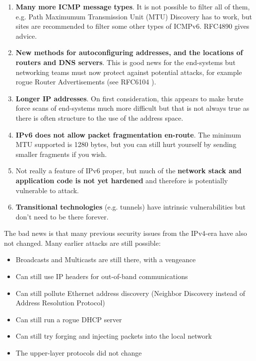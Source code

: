 \begin{enumerate}

\item {\bf Many more ICMP message types}. It is not possible to filter all of them, e.g. Path Maximumum Transmission Unit (MTU) Discovery has to work, but sites are recommended to filter some other types of ICMPv6. RFC4890 \cite{rfc} gives advice.

\item {\bf New methods for autoconfiguring addresses, and the locations of routers and DNS servers}. This is good news for the end-systems but networking teams must now protect against potential attacks, for example rogue Router Advertisements (see RFC6104 \cite{rfc}).

\item {\bf Longer IP addresses}. On first consideration, this appears to make brute force scans of end-systems much more difficult but that is not always true as there is often structure to the use of the address space. 

\item {\bf IPv6 does not allow packet fragmentation en-route}. The minimum MTU supported is 1280 bytes, but you can still hurt yourself by sending smaller fragments if you wish. 

\item Not really a feature of IPv6 proper, but much of the {\bf network stack and application code is not yet hardened} and therefore is potentially vulnerable to attack.

\item {\bf Transitional technologies} (e.g. tunnels) have intrinsic vulnerabilities but don't need to be there forever.

\end{enumerate}

The bad news is that many previous security issues from the IPv4-era have also not changed. 
Many earlier attacks are still possible:

\begin {itemize}
\item Broadcasts and Multicasts are still there, with a vengeance
\item Can still use IP headers for out-of-band communications
\item Can still pollute Ethernet address discovery (Neighbor Discovery instead of Address Resolution Protocol)
\item Can still run a rogue DHCP server
\item Can still try forging and injecting packets into the local network
\item The upper-layer protocols did not change
\end {itemize}




